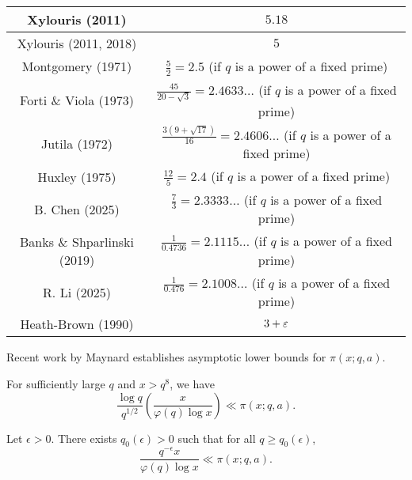 \begin{table}[ht]
\begin{tabular}{|c|c|}
    \hline
    Xylouris (2011) \cite{xylouris_2011} & $5.18$\\
    \hline
    Xylouris (2011, 2018) \cite{xylouris_thesis_2011} \cite{xylouris_2018} & $5$\\
    \hline
    Montgomery (1971) \cite{montgomery_topics_1971} & $\frac{5}{2} = 2.5$ (if $q$ is a power of a fixed prime) \\
    \hline
    Forti \& Viola (1973) \cite{Forti-Viola-Linnik1973} & $\frac{45}{20 - \sqrt{3}} = 2.4633 \dots$ (if $q$ is a power of a fixed prime) \\
    \hline
    Jutila (1972) \cite{Jutila-Linnik1972} & $\frac{3 (9 + \sqrt{17})}{16} = 2.4606 \dots$ (if $q$ is a power of a fixed prime) \\
    \hline
    Huxley (1975) \cite{huxley_large_1975b} & $\frac{12}{5} = 2.4$ (if $q$ is a power of a fixed prime) \\
    \hline
    B. Chen (2025) \cite{ChenBin-Linnik2025} & $\frac{7}{3} = 2.3333 \dots$ (if $q$ is a power of a fixed prime) \\
    \hline
    Banks \& Shparlinski (2019) \cite{Banks_Shparlinski_2019} & $\frac{1}{0.4736} = 2.1115 \dots$ (if $q$ is a power of a fixed prime) \\
    \hline
    R. Li (2025) \cite{li_number_2025} & $\frac{1}{0.476} = 2.1008 \dots$ (if $q$ is a power of a fixed prime) \\
    \hline
    Heath-Brown (1990) \cite{} & $3 + \varepsilon$ \\
    \hline
    \end{tabular}
\label{bt-l-table}
\end{table}

Recent work by Maynard \cite{maynard_2013} establishes asymptotic lower bounds for $\pi(x;q,a)$.

\begin{theorem}
For sufficiently large $q$ and $x>q^8$, we have
$$\frac{\log q}{q^{1/2}}\left(\frac x{\varphi(q)\log x}\right)\ll\pi(x;q,a).$$
\end{theorem}

\begin{theorem}
Let $\epsilon>0$. There exists $q_0(\epsilon)>0$ such that for all $q\geq q_0(\epsilon)$,
$$\frac{q^{-\epsilon}x}{\varphi(q)\log x}\ll\pi(x;q,a).$$
\end{theorem}
